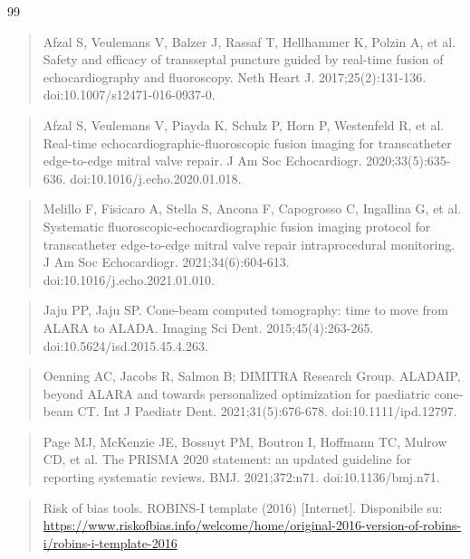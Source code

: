 \documentclass[12pt,a4paper,twoside]{article}
\providecommand{\ul}[1]{#1}
\begin{document}
\begin{thebibliography}{99}
\begin{quote}
  \end{quote}
  \begin{quote}
  Afzal S, Veulemans V, Balzer J, Rassaf T, Hellhammer K, Polzin A, et al. Safety and efficacy of transseptal puncture guided by real-time fusion of echocardiography and fluoroscopy. Neth Heart J. 2017;25(2):131-136. doi:10.1007/s12471-016-0937-0.
  \end{quote}
  \begin{quote}
  Afzal S, Veulemans V, Piayda K, Schulz P, Horn P, Westenfeld R, et al. Real-time echocardiographic-fluoroscopic fusion imaging for transcatheter edge-to-edge mitral valve repair. J Am Soc Echocardiogr. 2020;33(5):635-636. doi:10.1016/j.echo.2020.01.018.
  \end{quote}
  \begin{quote}
  Melillo F, Fisicaro A, Stella S, Ancona F, Capogrosso C, Ingallina G, et al. Systematic fluoroscopic-echocardiographic fusion imaging protocol for transcatheter edge-to-edge mitral valve repair intraprocedural monitoring. J Am Soc Echocardiogr. 2021;34(6):604-613. doi:10.1016/j.echo.2021.01.010.
  \end{quote}
  \begin{quote}
  Jaju PP, Jaju SP. Cone-beam computed tomography: time to move from ALARA to ALADA. Imaging Sci Dent. 2015;45(4):263-265. doi:10.5624/isd.2015.45.4.263.
  \end{quote}
  \begin{quote}
  Oenning AC, Jacobs R, Salmon B; DIMITRA Research Group. ALADAIP, beyond ALARA and towards personalized optimization for paediatric cone-beam CT. Int J Paediatr Dent. 2021;31(5):676-678. doi:10.1111/ipd.12797.
  \end{quote}
  \begin{quote}
  Page MJ, McKenzie JE, Bossuyt PM, Boutron I, Hoffmann TC, Mulrow CD, et al. The PRISMA 2020 statement: an updated guideline for reporting systematic reviews. BMJ. 2021;372:n71. doi:10.1136/bmj.n71.
  \end{quote}
  \begin{quote}
  Risk of bias tools. ROBINS-I template (2016) {[}Internet{]}. Disponibile su: \href{https://www.riskofbias.info/welcome/home/original-2016-version-of-robins-i/robins-i-template-2016}{\ul{https://www.riskofbias.info/welcome/home/original-2016-version-of-robins-i/robins-i-template-2016}}
  \end{quote}

\end{thebibliography}
\end{document}
